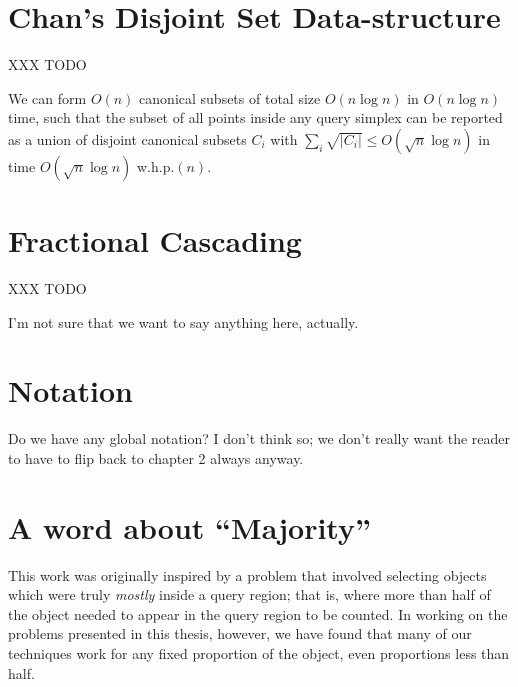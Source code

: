 \section{Chan's Disjoint Set Data-structure}
\label{:prelim:chan}

XXX TODO

\begin{theorem}
\label{th:chan}
We can form $O(n)$ canonical subsets of total size $O(n \log{n})$ in $O(n \log{n})$ time, such that the subset of all points inside any query simplex can be reported as a union of disjoint canonical subsets $C_i$ with $\sum_i{\sqrt{|C_i|}} \leq O(\sqrt{n}\log{n})$ in time $O(\sqrt{n}\log{n})$ w.h.p.$(n)$.
\end{theorem}


\section{Fractional Cascading}
\label{:prelim:fractional-cascading}

XXX TODO

I'm not sure that we want to say anything here, actually.


\section{Notation}
\label{:prelim:notation}

Do we have any global notation?  I don't think so;  we don't really want the reader to have to flip back to chapter 2 always anyway.


\section{A word about ``Majority''}

This work was originally inspired by a problem that involved selecting objects which were truly \emph{mostly} inside a query region; that is, where more than half of the object needed to appear in the query region to be counted.  In working on the problems presented in this thesis, however, we have found that many of our techniques work for any fixed proportion of the object, even proportions less than half.

